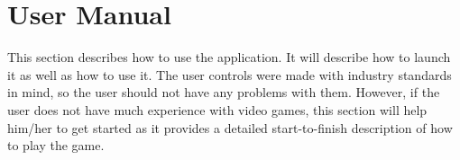 \chapter{User Manual}
This section describes how to use the application.
It will describe how to launch it as well as how to use it.
The user controls were made with industry standards in mind, so the user should not have any problems with them.
However, if the user does not have much experience with video games, this section will help him/her to get started as it provides a detailed start-to-finish description of how to play the game.








